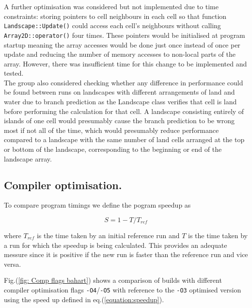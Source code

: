 A further optimisation was considered but not implemented due to time constraints: storing pointers to cell neighbours in each cell so that function \texttt{Landscape::Update()} could access each cell's neighbours without calling \texttt{Array2D::operator()} four times.
These pointers would be initialised at program startup meaning the array accesses would be done just once instead of once per update and reducing the number of memory accesses to non-local parts of the array.
However, there was insufficient time for this change to be implemented and tested.\\

The group also considered checking whether any difference in performance could be found between runs on landscapes with different arrangements of land and water due to branch prediction as the Landscape class verifies that cell is land before performing the calculation for that cell.
A landscape consisting entirely of islands of one cell would presumably cause the branch prediction to be wrong most if not all of the time, which would presumably reduce performance compared to a landscape with the same number of land cells arranged at the top or bottom of the landscape, corresponding to the beginning or end of the landscape array.


\subsection{Compiler optimisation.}
\label{Compiler optimisation}

To compare program timings we define the pogram speedup as

\begin{equation}
S = 1-T/ T_{ref}
\label{equation:speedup}
\end{equation}

where $T_{ref}$ is the time taken by an initial reference run and ${T}$ is the time taken by a run for which the speedup is being calculated. This provides an adequate messure since it is positive if the new run is faster than the reference run and vice versa. 

Fig.(\ref{fig: Comp flags bahart}) shows a comparison of builds with different compiler optimisation flags \texttt{-O4}/\texttt{-O5} with reference to the \texttt{-O3} optimised version using the speed up defined in eq.(\ref{equation:speedup}).

